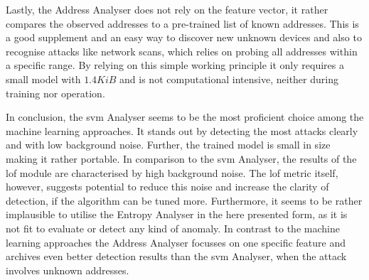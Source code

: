 Lastly, the Address Analyser does not rely on the feature vector, it rather compares the observed addresses to a pre-trained list of known addresses. This is a good supplement and an easy way to discover new unknown devices and also to recognise attacks like network scans, which relies on probing all addresses within a specific range.
By relying on this simple working principle it only requires a small model with $1.4 KiB$ and is not computational intensive, neither during training nor operation.

In conclusion, the \gls{svm} Analyser seems to be the most proficient choice among the machine learning approaches. It stands out by detecting the most attacks clearly and with low background noise. Further, the trained model is small in size making it rather portable. 
In comparison to the \gls{svm} Analyser, the results of the \gls{lof} module are characterised by high background noise. The \gls{lof} metric itself, however, suggests potential to reduce this noise and increase the clarity of detection, if the algorithm can be tuned more.
Furthermore, it seems to be rather implausible to utilise the Entropy Analyser in the here presented form, as it is not fit to evaluate or detect any kind of anomaly.
In contrast to the machine learning approaches the Address Analyser focusses on one specific feature and archives even better detection results than the \gls{svm} Analyser, when the attack involves unknown addresses.
